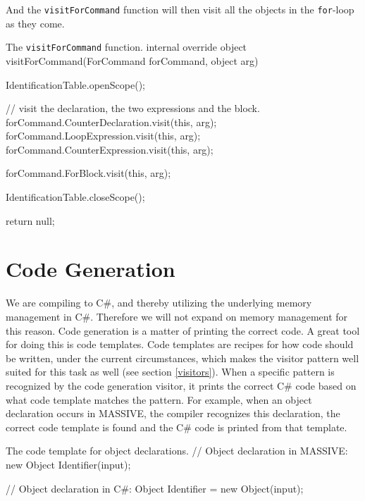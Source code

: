 And the \texttt{visitForCommand} function will then visit all the objects in the \texttt{for}-loop as they come.
\newline
\begin{source}{The \texttt{visitForCommand} function.}{}
internal override object visitForCommand(ForCommand forCommand, object arg)
		{
				IdentificationTable.openScope();

        // visit the declaration, the two expressions and the block.
        forCommand.CounterDeclaration.visit(this, arg);
        forCommand.LoopExpression.visit(this, arg);
        forCommand.CounterExpression.visit(this, arg);

        forCommand.ForBlock.visit(this, arg);

        IdentificationTable.closeScope();
						
        return null;
    }
\end{source}

\section{Code Generation}
We are compiling to C\#, and thereby utilizing the underlying memory management in C\#. Therefore we will not expand on memory management for this reason.
Code generation is a matter of printing the correct code. \newline
A great tool for doing this is code templates. 
Code templates are recipes for how code should be written, under the current circumstances, which makes the visitor pattern well suited for this task as well (see section \ref{visitors}).\newline
When a specific pattern is recognized by the code generation visitor, it prints the correct C\# code based on what code template matches the pattern. 
For example, when an object declaration occurs in MASSIVE, the compiler recognizes this declaration, the correct code template is found and the C\# code is printed from that template. \newline

\begin{source}{The code template for object declarations.}{}
// Object declaration in MASSIVE:
new Object Identifier(input);

// Object declaration in C#:
Object Identifier = new Object(input);
\end{source}
